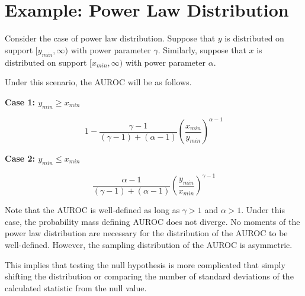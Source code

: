 \section{Example: Power Law Distribution}

Consider the case of power law distribution.
Suppose that $y$ is distributed on support $[y_{min}, \infty)$ with power parameter $\gamma$.
Similarly, suppose that $x$ is distributed on support $[x_{min}, \infty)$ with power parameter $\alpha$. 

Under this scenario, the AUROC will be as follows.


\textbf{Case 1: $y_{min} \geq x_{min}$}

\begin{equation}\label{eqn:powAUROC1}
  1 - \frac{\gamma - 1}{(\gamma - 1) + (\alpha - 1)}
    \left( \frac{x_{min}}{y_{min}} \right) ^{\alpha - 1}
\end{equation}

\textbf{Case 2: $y_{min} \leq x_{min}$}

\begin{equation}\label{eqn:powAUROC2}
  \frac{\alpha - 1}{(\gamma - 1) + (\alpha - 1)}
    \left( \frac{y_{min}}{x_{min}} \right) ^{\gamma - 1}
\end{equation}


Note that the AUROC is well-defined as long as $\gamma > 1$ and $\alpha > 1$. 
Under this case, the probability mass defining AUROC does not diverge. 
No moments of the power law distribution are necessary for the distribution of the AUROC to be well-defined. However, the sampling distribution of the AUROC is asymmetric. 

This implies that testing the null hypothesis is more complicated that simply shifting the distribution or comparing the number of standard deviations of the calculated statistic from the null value. 










